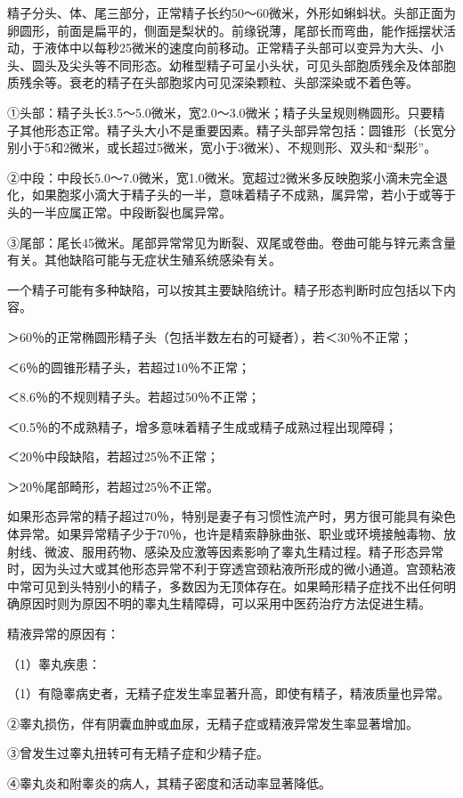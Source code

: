 \documentclass[12pt,UTF8,openany]{ctexbook}
\begin{document}
精子分头、体、尾三部分，正常精子长约50～60微米，外形如蝌蚪状。头部正面为卵圆形，前面是扁平的，侧面是梨状的。前缘锐薄，尾部长而弯曲，能作摇摆状活动，于液体中以每秒25微米的速度向前移动。正常精子头部可以变异为大头、小头、圆头及尖头等不同形态。幼稚型精子可呈小头状，可见头部胞质残余及体部胞质残余等。衰老的精子在头部胞浆内可见深染颗粒、头部深染或不着色等。

①头部：精子头长3.5～5.0微米，宽2.0～3.0微米；精子头呈规则椭圆形。只要精子其他形态正常。精子头大小不是重要因素。精子头部异常包括：圆锥形（长宽分别小于5和2微米，或长超过5微米，宽小于3微米）、不规则形、双头和“梨形”。

②中段：中段长5.0～7.0微米，宽1.0微米。宽超过2微米多反映胞浆小滴未完全退化，如果胞浆小滴大于精子头的一半，意味着精子不成熟，属异常，若小于或等于头的一半应属正常。中段断裂也属异常。

③尾部：尾长45微米。尾部异常常见为断裂、双尾或卷曲。卷曲可能与锌元素含量有关。其他缺陷可能与无症状生殖系统感染有关。

一个精子可能有多种缺陷，可以按其主要缺陷统计。精子形态判断时应包括以下内容。

＞60％的正常椭圆形精子头（包括半数左右的可疑者），若＜30％不正常；

＜6％的圆锥形精子头，若超过10％不正常；

＜8.6％的不规则精子头。若超过50％不正常；

＜0.5％的不成熟精子，增多意味着精子生成或精子成熟过程出现障碍；

＜20％中段缺陷，若超过25％不正常；

＞20％尾部畸形，若超过25％不正常。

如果形态异常的精子超过70％，特别是妻子有习惯性流产时，男方很可能具有染色体异常。如果异常精子少于70％，也许是精索静脉曲张、职业或环境接触毒物、放射线、微波、服用药物、感染及应激等因素影响了睾丸生精过程。精子形态异常时，因为头过大或其他形态异常不利于穿透宫颈粘液所形成的微小通道。宫颈粘液中常可见到头特别小的精子，多数因为无顶体存在。如果畸形精子症找不出任何明确原因时则为原因不明的睾丸生精障碍，可以采用中医药治疗方法促进生精。

精液异常的原因有：

（1）睾丸疾患：

（1）有隐睾病史者，无精子症发生率显著升高，即使有精子，精液质量也异常。

②睾丸损伤，伴有阴囊血肿或血尿，无精子症或精液异常发生率显著增加。

③曾发生过睾丸扭转可有无精子症和少精子症。

④睾丸炎和附睾炎的病人，其精子密度和活动率显著降低。
\end{document}
